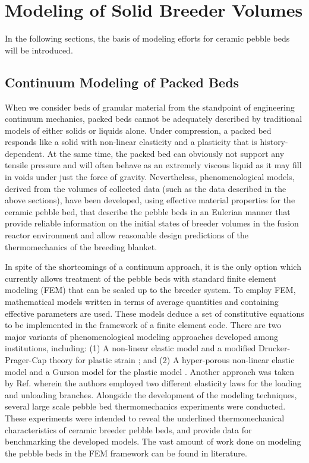 \documentclass[11pt]{report} %
\begin{document}
\FloatBarrier
\section{Modeling of Solid Breeder Volumes}

In the following sections, the basis of modeling efforts for ceramic pebble beds will be introduced.

\subsection{Continuum Modeling of Packed Beds}
When we consider beds of granular material from the standpoint of engineering continuum mechanics, packed beds cannot be adequately described by traditional models of either solids or liquids alone. Under compression, a packed bed responds like a solid with non-linear elasticity and a plasticity that is history-dependent. At the same time, the packed bed can obviously not support any tensile pressure and will often behave as an extremely viscous liquid as it may fill in voids under just the force of gravity. Nevertheless, phenomenological models, derived from the volumes of collected data (such as the data described in the above sections), have been developed, using effective material properties for the ceramic pebble bed, that describe the pebble beds in an Eulerian manner that provide reliable information on the initial states of breeder volumes in the fusion reactor environment and allow reasonable design predictions of the thermomechanics of the breeding blanket. 

In spite of the shortcomings of a continuum approach, it is the only option which currently allows treatment of the pebble beds with standard finite element modeling (FEM) that can be scaled up to the breeder system. To employ FEM, mathematical models written in terms of average quantities and containing effective parameters are used. These models deduce a set of constitutive equations to be implemented in the framework of a finite element code.  There are two major variants of phenomenological modeling approaches developed among institutions, including: (1) A non-linear elastic model and a modified Drucker-Prager-Cap theory for plastic strain \cite{Gan2007189,Fokkens2003}; and (2) A hyper-porous non-linear elastic model and a Gurson model for the plastic model \cite{DellOrco:2007hc,DellOrco:2010zr,DiMaio20081287}. Another approach was taken by Ref.\cite{Fokkens2003} wherein the authors employed two different elasticity laws for the loading and unloading branches. Alongside the development of the modeling techniques, several large scale pebble bed thermomechanics experiments were conducted. These experiments were intended to reveal the underlined thermomechanical characteristics of ceramic breeder pebble beds, and provide data for benchmarking the developed models. The vast amount of work done on modeling the pebble beds in the FEM framework can be found in literature. \cite{DellOrco:2007hc,DellOrco:2010zr,DiMaio20101234,Gan:2009vn,Gan:2010lh,Gan:2010kc,Gan2007189} 
\end{document}
